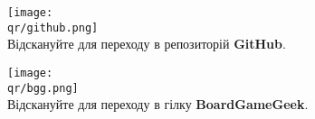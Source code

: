 \bigbreak

\begin{multicols}{2}
\centering
\texttt{[image: \\qr/github.png]}\\
Відскануйте для переходу в репозиторій \textbf{GitHub}.

\columnbreak

\texttt{[image: \\qr/bgg.png]}\\
Відскануйте для переходу в гілку \textbf{BoardGameGeek}.
\end{multicols}

